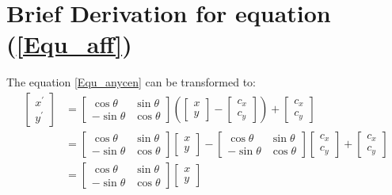 \section{Brief Derivation for equation (\ref{Equ_aff})}
\par\noindent
The equation \ref{Equ_anycen} can be transformed to:
\begin{equation*}
  \begin{split}
  \begin{bmatrix}
   x^{'} \\ y^{'}
   \end{bmatrix} &= \begin{bmatrix} \cos\theta & \sin\theta \\ -\sin\theta & \cos\theta \end{bmatrix} \left(\begin{bmatrix} x \\ y \end{bmatrix} - \begin{bmatrix} c_{x} \\ c_{y} \end{bmatrix}\right) + \begin{bmatrix} c_{x} \\ c_{y} \end{bmatrix} \\
                 &= \begin{bmatrix}
          \cos\theta & \sin\theta \\
          -\sin\theta & \cos\theta
        \end{bmatrix}
        \begin{bmatrix}
          x \\ y
         \end{bmatrix} - \begin{bmatrix}
            \cos\theta & \sin\theta \\
            -\sin\theta & \cos\theta
          \end{bmatrix}\begin{bmatrix}
            c_{x} \\ c_{y}
          \end{bmatrix} + \begin{bmatrix}
            c_{x} \\ c_{y}
          \end{bmatrix} \\
          &= \begin{bmatrix} \cos\theta & \sin\theta \\ -\sin\theta & \cos\theta \end{bmatrix} \begin{bmatrix} x \\ y \end{bmatrix}

\end{split}
\end{equation*}
